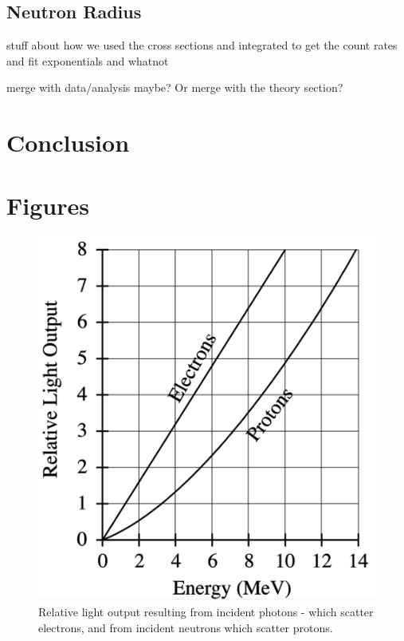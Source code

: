\documentclass{article}
\begin{document}
  \subsection{Neutron Radius}
  stuff about how we used the cross sections and integrated to get the count rates and fit exponentials and whatnot

  \hspace{.25cm}

  merge with data/analysis maybe?  Or merge with the theory section?

\section{Conclusion}

\section{Figures}
  \begin{figure}[!htb]
    \centering
    \includegraphics[scale=.5]{relative_response.png}
    \caption{Relative light output resulting from incident photons - which scatter electrons, and from incident neutrons which scatter protons.}
    \label{response}
  \end{figure}
\end{document}
